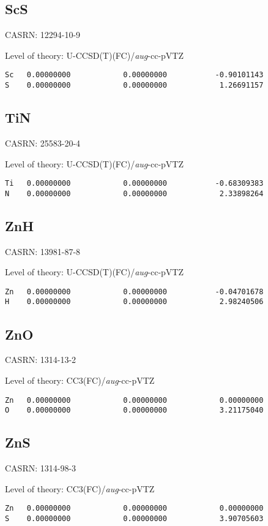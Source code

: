 \documentclass[journal=jctcce,manuscript=article,layout=traditional]{achemso}
\newcommand{\AVTZ}{\emph{aug}-cc-pVTZ}
\begin{document}
\subsection{ScS}

CASRN: 12294-10-9

\begin{singlespace}
\noindent Level of theory: U-CCSD(T)(FC)/{\AVTZ}
\begin{verbatim}
Sc   0.00000000            0.00000000           -0.90101143
S    0.00000000            0.00000000            1.26691157
\end{verbatim}
\end{singlespace}

\subsection{TiN}

CASRN: 25583-20-4

\begin{singlespace}
\noindent Level of theory: U-CCSD(T)(FC)/{\AVTZ}
\begin{verbatim}
Ti   0.00000000            0.00000000           -0.68309383
N    0.00000000            0.00000000            2.33898264
\end{verbatim}
\end{singlespace}

\subsection{ZnH}

CASRN: 13981-87-8

\begin{singlespace}
\noindent Level of theory: U-CCSD(T)(FC)/{\AVTZ}
\begin{verbatim}
Zn   0.00000000            0.00000000           -0.04701678
H    0.00000000            0.00000000            2.98240506
\end{verbatim}
\end{singlespace}

\subsection{ZnO}

CASRN: 1314-13-2

\begin{singlespace}
\noindent Level of theory: CC3(FC)/{\AVTZ}
\begin{verbatim}
Zn   0.00000000            0.00000000            0.00000000
O    0.00000000            0.00000000            3.21175040
\end{verbatim}
\end{singlespace}

\subsection{ZnS}

CASRN: 1314-98-3

\begin{singlespace}
\noindent Level of theory: CC3(FC)/{\AVTZ}
\begin{verbatim}
Zn   0.00000000            0.00000000            0.00000000
S    0.00000000            0.00000000            3.90705603
\end{verbatim}
\end{singlespace}

\clearpage
\end{document}
